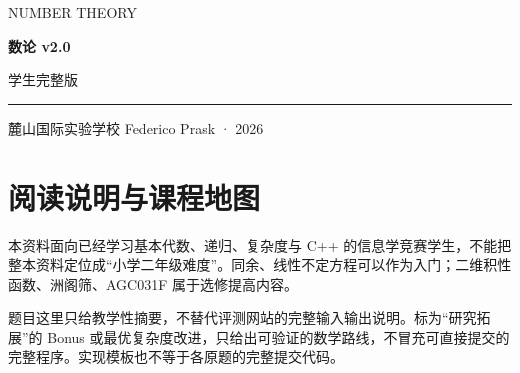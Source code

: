 \documentclass[UTF8,a4paper,11pt,twoside,openright,fontset=fandol]{ctexbook}
\theoremstyle{definition}
\newcommand{\docversion}{v2.0}
\begin{document}
\frontmatter
\begin{titlepage}
\setlength{\parindent}{0pt}
\vspace*{1.2cm}
{\large\color{accent}NUMBER THEORY}\par
\vspace{1cm}
{\fontsize{46}{65}\selectfont\bfseries\color{ink}数论 \huge{\docversion}}\par
\vspace{0.5cm}
{\Large 学生完整版}\par
\vspace{0.5cm}
{\color{accent}\rule{\textwidth}{1.2pt}}\par
\vspace{0.3cm}
\begin{minipage}{0.9\textwidth}
\large 麓山国际实验学校 Federico Prask · 2026
\end{minipage}\par
\vfill
{\normalsize }\par
{\small}
\end{titlepage}
\chapter*{阅读说明与课程地图}

\begin{pitfall}[适用范围与阅读边界]
本资料面向已经学习基本代数、递归、复杂度与 C++ 的信息学竞赛学生，不能把整本资料定位成“小学二年级难度”。同余、线性不定方程可以作为入门；二维积性函数、洲阁筛、AGC031F 属于选修提高内容。

题目这里只给教学性摘要，不替代评测网站的完整输入输出说明。标为“研究拓展”的 Bonus 或最优复杂度改进，只给出可验证的数学路线，不冒充可直接提交的完整程序。实现模板也不等于各原题的完整提交代码。
\end{pitfall}
\end{document}
